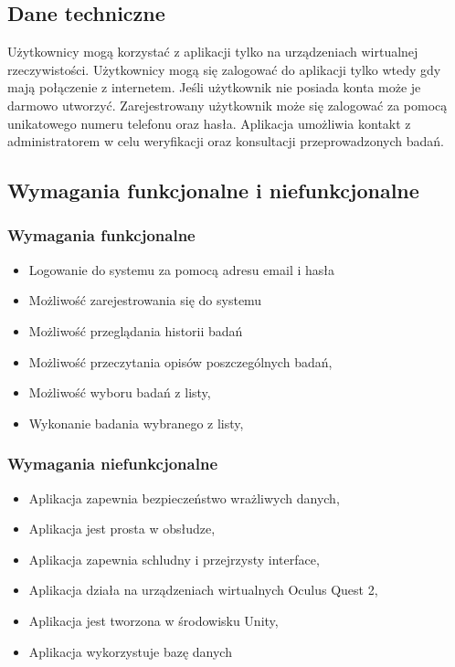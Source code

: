 \documentclass[12pt, letterpaper]{article}
\begin{document}
	\subsection{Dane techniczne}
	
	Użytkownicy mogą korzystać z aplikacji tylko na urządzeniach wirtualnej rzeczywistości. Użytkownicy mogą się zalogować do aplikacji tylko wtedy gdy mają połączenie z internetem. Jeśli użytkownik nie posiada konta może je darmowo utworzyć. Zarejestrowany użytkownik może się zalogować za pomocą unikatowego numeru telefonu oraz hasła. Aplikacja umożliwia kontakt z administratorem w celu weryfikacji oraz konsultacji przeprowadzonych badań.
	

	\subsection{Wymagania funkcjonalne i niefunkcjonalne}

		\subsubsection{Wymagania funkcjonalne}
		
			\begin{itemize}
				\item Logowanie do systemu za pomocą adresu email i hasła
				\item Możliwość zarejestrowania się do systemu
				\item Możliwość przeglądania historii badań
				\item Możliwość przeczytania opisów poszczególnych badań,
				\item Możliwość wyboru badań z listy,
				\item Wykonanie badania wybranego z listy,
			\end{itemize}
			
		\subsubsection{Wymagania niefunkcjonalne}
		
			\begin{itemize}
				\item Aplikacja zapewnia bezpieczeństwo wrażliwych danych,
				\item Aplikacja jest prosta w obsłudze,
				\item Aplikacja zapewnia schludny i przejrzysty interface,
				\item Aplikacja działa na urządzeniach wirtualnych Oculus Quest 2,
				\item Aplikacja jest tworzona w środowisku Unity,
				\item Aplikacja wykorzystuje bazę danych
			\end{itemize}
			
\end{document}

